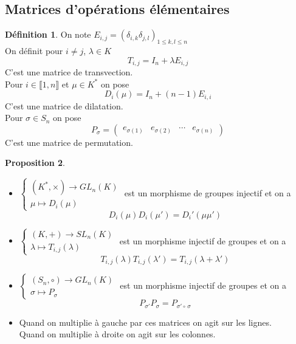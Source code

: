 \documentclass[10pt,a4paper]{article}
\theoremstyle{definition}
\newtheorem{proposition}{Proposition}[section]
\newtheorem{definition}[proposition]{Définition}
\begin{document}
\subsection{Matrices d'opérations élémentaires}
\begin{definition}
On note $E_{i, j} = (\delta_{i, k} \delta_{j, l})_{1 \leq k, l \leq n}$ \\
On définit pour $i \neq j$, $\lambda \in K$
\[ T_{i, j} = I_n + \lambda E_{i, j} \]
C'est une matrice de transvection. \\
Pour $i \in \llbracket 1, n \rrbracket$ et $\mu \in K^*$ on pose
\[ D_i(\mu) = I_n + (n - 1)E_{i, i} \]
C'est une matrice de dilatation. \\
Pour $\sigma \in S_n$ on pose
\[ P_\sigma = \left( \begin{array}{c|c|c|c}
e_{\sigma(1)} & e_{\sigma(2)} & \cdots & e_{\sigma(n)}
\end{array} \right) \]
C'est une matrice de permutation.
\end{definition}
\begin{proposition}
\hfill
\begin{itemize}
\item $ \begin{cases}
(K^*, \times) \to GL_n(K) \\
\mu \mapsto D_i(\mu)
\end{cases} $
est un morphisme de groupes injectif et on a
\[ D_i(\mu) D_i(\mu') = D_i'(\mu \mu') \]
\item $ \begin{cases}
(K, +) \to SL_n(K) \\
\lambda \mapsto T_{i, j}(\lambda)
\end{cases} $
est un morphisme injectif de groupes et on a
\[ T_{i, j}(\lambda) T_{i, j}(\lambda') = T_{i, j}(\lambda + \lambda') \]
\item $ \begin{cases}
(S_n, \circ) \to GL_n(K) \\
\sigma \mapsto P_\sigma
\end{cases} $
est un morphisme injectif de groupes et on a 
\[P_{\sigma'} P_{\sigma} = P_{\sigma' \circ \, \sigma} \]
\item Quand on multiplie à gauche par ces matrices on agit sur les lignes. \\
Quand on multiplie à droite on agit sur les colonnes.
\end{itemize}
\end{proposition}
\end{document}
